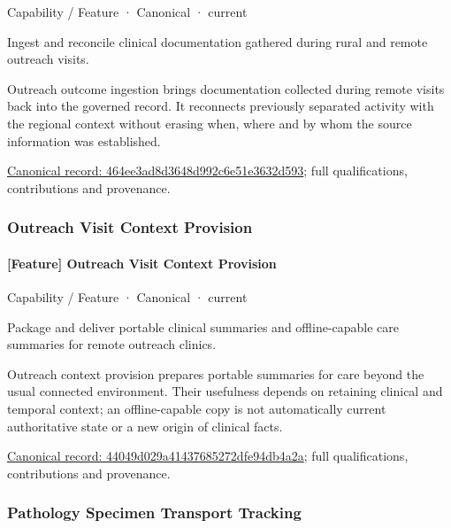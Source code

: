 \label{element:464ee3ad8d3648d992c6e51e3632d593}
{\small Capability / Feature · Canonical · current}\par

Ingest and reconcile clinical documentation gathered during rural and remote outreach visits.



Outreach outcome ingestion brings documentation collected during remote visits back into the governed record. It reconnects previously separated activity with the regional context without erasing when, where and by whom the source information was established.


{\footnotesize \href{../../../../continuum/strategy/capability/feature/464ee3ad8d3648d992c6e51e3632d593.md}{Canonical record: 464ee3ad8d3648d992c6e51e3632d593}; full qualifications, contributions and provenance.}\par
\subsubsection{Outreach Visit Context Provision}

\paragraph{[Feature] Outreach Visit Context Provision}

\label{element:44049d029a41437685272dfe94db4a2a}
{\small Capability / Feature · Canonical · current}\par

Package and deliver portable clinical summaries and offline-capable care summaries for remote outreach clinics.



Outreach context provision prepares portable summaries for care beyond the usual connected environment. Their usefulness depends on retaining clinical and temporal context; an offline-capable copy is not automatically current authoritative state or a new origin of clinical facts.


{\footnotesize \href{../../../../continuum/strategy/capability/feature/44049d029a41437685272dfe94db4a2a.md}{Canonical record: 44049d029a41437685272dfe94db4a2a}; full qualifications, contributions and provenance.}\par
\subsubsection{Pathology Specimen Transport Tracking}

